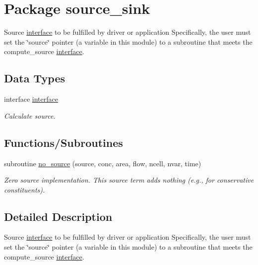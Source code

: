 \hypertarget{a00069}{
\section{Package source\_\-sink}
\label{a00069}
}
Source \hyperlink{a00002}{interface} to be fulfilled by driver or application Specifically, the user must set the \char`\"{}source\char`\"{} pointer (a variable in this module) to a subroutine that meets the compute\_\-source \hyperlink{a00002}{interface}.  


\subsection*{Data Types}
\begin{CompactItemize}
\item 
interface \hyperlink{a00002}{interface}
\begin{CompactList}\small\item\em Calculate source. \item\end{CompactList}\end{CompactItemize}
\subsection*{Functions/Subroutines}
\begin{CompactItemize}
\item 
subroutine \hyperlink{a00069_55d2e6a4c1b1ffb79f6bc5b4e39b9c2c}{no\_\-source} (source, conc, area, flow, ncell, nvar, time)
\begin{CompactList}\small\item\em Zero source implementation. This source term adds nothing (e.g., for conservative constituents). \item\end{CompactList}\end{CompactItemize}


\subsection{Detailed Description}
Source \hyperlink{a00002}{interface} to be fulfilled by driver or application Specifically, the user must set the \char`\"{}source\char`\"{} pointer (a variable in this module) to a subroutine that meets the compute\_\-source \hyperlink{a00002}{interface}. 



